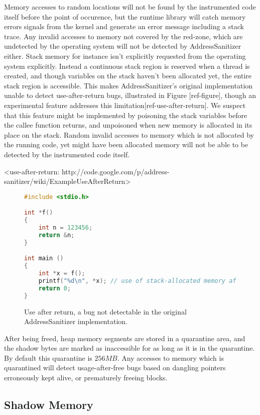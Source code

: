 \noindent Memory accesses to random locations will not be found by the
instrumented code itself before the point of occurence, but the runtime library
will catch memory errors signals from the kernel and generate an error message
including a stack trace.
Any invalid accesses to memory not covered by the red-zone, which are undetected
by the operating system will not be detected by AddressSanitizer either.
Stack memory for instance isn't explicitly requested from the operating system
explicitly.
Instead a continuous stack region is reserved when a thread is created, and
though variables on the stack haven't been allocated yet, the entire stack
region is accessible.
This makes AddressSanitizer's original implementation unable to detect
use-after-return bugs, illustrated in Figure [ref-figure], though an
experimental feature addresses this limitation[ref-use-after-return].
We suspect that this feature might be implemented by poisoning the stack
variables before the callee function returns, and unpoisoned when new memory
is allocated in its place on the stack.
Random invalid accesses to memory which is not allocated by the running code,
yet might have been allocated memory will not be able to be detected by the
instrumented code itself.

<use-after-return: http://code.google.com/p/address-sanitizer/wiki/ExampleUseAfterReturn>

\begin{figure}[ht]
\begin{lstlisting}[language=C]
#include <stdio.h>

int *f()
{
    int n = 123456;
    return &n;
}

int main ()
{
    int *x = f();
    printf("%d\n", *x); // use of stack-allocated memory after return
    return 0;
}
\end{lstlisting}
\caption{Use after return, a bug not detectable in the original AddressSanitizer
implementation.}
\end{figure}

After being freed, heap memory segments are stored in a quarantine
area, and the shadow bytes are marked as inaccessible for as long as it is in
the quarantine.
By default this quarantine is $256 MB$.
Any accesses to memory which is quarantined will detect usage-after-free bugs
based on dangling pointers erroneously kept alive, or prematurely
freeing blocks.

\subsection {Shadow Memory}

